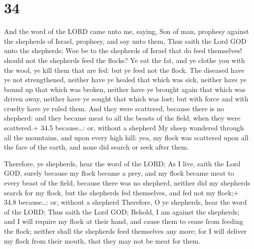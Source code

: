 \hypertarget{section-33}{%
\section{34}\label{section-33}}

 And the word of the LORD came unto me, saying, 
Son of man, prophesy against the shepherds of Israel, prophesy, and say
unto them, Thus saith the Lord GOD unto the shepherds; Woe be to the
shepherds of Israel that do feed themselves! should not the shepherds
feed the flocks?  Ye eat the fat, and ye clothe you with the
wool, ye kill them that are fed: but ye feed not the flock. 
The diseased have ye not strengthened, neither have ye healed that which
was sick, neither have ye bound up that which was broken, neither have
ye brought again that which was driven away, neither have ye sought that
which was lost; but with force and with cruelty have ye ruled them.
 And they were scattered, because there is no shepherd: and
they became meat to all the beasts of the field, when they were
scattered.+ 34.5 because\ldots: or, without a shepherd  My
sheep wandered through all the mountains, and upon every high hill: yea,
my flock was scattered upon all the face of the earth, and none did
search or seek after them.

 Therefore, ye shepherds, hear the word of the LORD;
 As I live, saith the Lord GOD, surely because my flock
became a prey, and my flock became meat to every beast of the field,
because there was no shepherd, neither did my shepherds search for my
flock, but the shepherds fed themselves, and fed not my flock;+ 34.8
because\ldots: or, without a shepherd  Therefore, O ye
shepherds, hear the word of the LORD;  Thus saith the Lord
GOD; Behold, I am against the shepherds; and I will require my flock at
their hand, and cause them to cease from feeding the flock; neither
shall the shepherds feed themselves any more; for I will deliver my
flock from their mouth, that they may not be meat for them.

